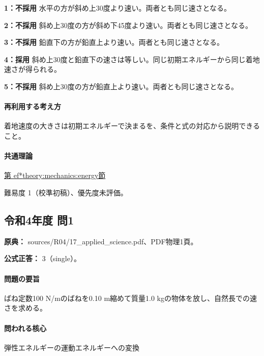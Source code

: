 \noindent\textbf{1：不採用} 水平の方が斜め上30度より速い。両者とも同じ速さとなる。\par

\noindent\textbf{2：不採用} 斜め上30度の方が斜め下45度より速い。両者とも同じ速さとなる。\par

\noindent\textbf{3：不採用} 鉛直下の方が鉛直上より速い。両者とも同じ速さとなる。\par

\noindent\textbf{4：採用} 斜め上30度と鉛直下の速さは等しい。同じ初期エネルギーから同じ着地速さが得られる。\par

\noindent\textbf{5：不採用} 斜め上30度の方が鉛直上より速い。両者とも同じ速さとなる。\par

\paragraph{再利用する考え方} 着地速度の大きさは初期エネルギーで決まるを、条件と式の対応から説明できること。

\paragraph{共通理論} \hyperref[theory:mechanics:energy]{第
ef*{theory:mechanics:energy}節}

\par 難易度 1（校準初稿）、優先度未評価。

\subsection{令和4年度 問1}
\label{q:r04-reg-applied-01}

\noindent\textbf{原典：} sources/R04/17\_applied\_science.pdf、PDF物理1頁。

\textbf{公式正答：} 3（single）。

\paragraph{問題の要旨} ばね定数100 N/mのばねを0.10 m縮めて質量1.0 kgの物体を放し、自然長での速さを求める。

\paragraph{問われる核心} 弾性エネルギーの運動エネルギーへの変換

